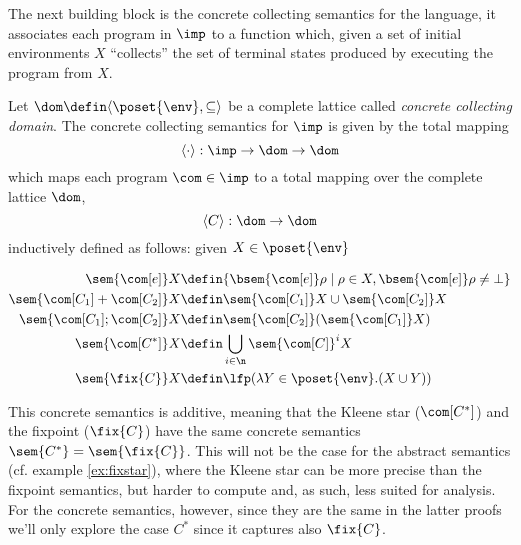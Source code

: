 The next building block is the concrete collecting semantics for the
language, it associates each program in \(\imp\) to a function which,
given a set of initial environments \(X\) ``collects'' the set of
terminal states produced by executing the program from \(X\).

\begin{definition}
  Let \(\dom \defin \langle \poset{\env} , \subseteq \rangle\) be a
  complete lattice called \emph{concrete collecting domain}. The
  concrete collecting semantics for \(\imp\) is given by the total
  mapping \[\langle \cdot \rangle : \imp \to \dom \to \dom\] which
  maps each program \(\com \in \imp\) to a total mapping over the
  complete lattice \(\dom\), \[\langle C \rangle : \dom \to \dom\]
  inductively defined as follows: given \(X \in \poset{\env}\)

  \begin{align*}
    \sem{\com[e]} X & \defin \{\bsem{\com[e]} \rho \mid \rho \in X,
    \bsem{\com[e]} \rho \neq \bot\} \\
    \sem{\com[C_1] + \com[C_2]} X & \defin \sem{\com[C_1]} X \cup \sem{\com[C_2]} X \\
    \sem{\com[C_1] ; \com[C_2]} X & \defin \sem{\com[C_2]}(\sem{\com[C_1]} X) \\
    \sem{\com[C^*]} X & \defin \bigcup_{i \in \n} \sem{\com[C]}^i X \\
    \sem{\fix{C}} X & \defin \lfp(\lambda Y \in\poset{\env} . (X \cup Y))
  \end{align*}
\end{definition}

This concrete semantics is additive, meaning that the Kleene star
(\(\com[C^*]\)) and the fixpoint (\(\fix{C}\)) have the same concrete
semantics \(\sem{C^*} = \sem{\fix{C}}\).  This will not be the case
for the abstract semantics (cf. example \ref{ex:fixstar}), where the
Kleene star can be more precise than the fixpoint semantics, but
harder to compute and, as such, less suited for analysis. For the
concrete semantics, however, since they are the same in the latter
proofs we'll only explore the case \(C^*\) since it captures also
\(\fix{C}\).


